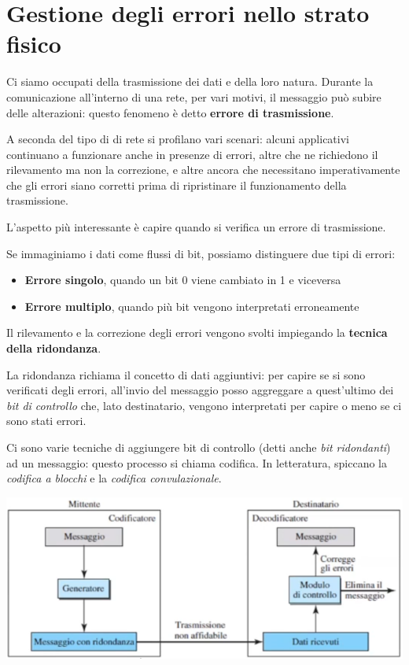 \section{Gestione degli errori nello strato fisico}

    Ci siamo occupati della trasmissione dei dati e della loro natura. Durante la comunicazione all'interno di una rete, per vari motivi, il messaggio può subire delle alterazioni: questo fenomeno è detto \textbf{errore di trasmissione}. 
    
    A seconda del tipo di di rete si profilano vari scenari: alcuni applicativi continuano a funzionare anche in presenze di errori, altre che ne richiedono il rilevamento ma non la correzione, e altre ancora che necessitano imperativamente che gli errori siano corretti prima di ripristinare il funzionamento della trasmissione.
    
    \vspace{3mm}
    
    L'aspetto più interessante è capire quando si verifica un errore di trasmissione.
    
    Se immaginiamo i dati come flussi di bit, possiamo distinguere due tipi di errori:
    
    \begin{itemize}
        \item \textbf{Errore singolo}, quando un bit 0 viene cambiato in 1 e viceversa
        \item \textbf{Errore multiplo}, quando più bit vengono interpretati erroneamente
    \end{itemize}
    
    Il rilevamento e la correzione degli errori vengono svolti impiegando la \textbf{tecnica della ridondanza}.
    
    La ridondanza richiama il concetto di dati aggiuntivi: per capire se si sono verificati degli errori, all'invio del messaggio posso aggreggare a quest'ultimo dei \textit{bit di controllo} che, lato destinatario, vengono interpretati per capire o meno se ci sono stati errori.
    
    \vspace{3mm}
    
    Ci sono varie tecniche di aggiungere bit di controllo (detti anche \textit{bit ridondanti}) ad un messaggio: questo processo si chiama codifica. In letteratura, spiccano la \textit{codifica a blocchi} e la \textit{codifica convulazionale}.
    
    \begin{center}
        \includegraphics[scale=0.5]{images/Esempio-Codifica.png}
    \end{center}
    
